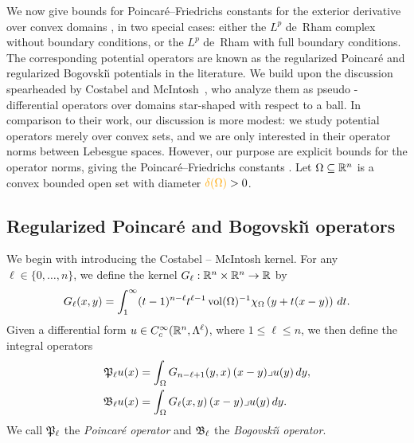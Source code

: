 \documentclass[10pt,letterpaper]{article}
\newcommand\cye[1]{%
  \protect\leavevmode
  \begingroup
    \color{red!35!yellow}%
    #1%
  \endgroup
}
\begin{document}
We \cye{now give} bounds for Poincar\'e--Friedrichs constants for the exterior derivative over convex domains\cye{, in} two special cases: 
either the $L^{p}$ de~Rham complex without boundary conditions, \cye{or} the $L^{p}$ de~Rham with full boundary conditions. 
The corresponding potential operators are known as the regularized Poincar\'e and regularized Bogovski\u{\i} potentials in the literature. 
We build upon the discussion spearheaded by Costabel and McIntosh~\cite{costabel2010bogovskiui},
who analyze them as pseudo\cye{-}differential operators over domains star-shaped with respect to a ball. 
In comparison to their work, our discussion is more modest:
we study potential operators merely over convex sets, and we are only interested in their operator norms between Lebesgue spaces.
However, our purpose are explicit bounds for the operator norms, \cye{giving the Poincar\'e--Friedrichs constants}. Let $\Omega \subseteq {\mathbb R}^{n}$ is a convex bounded open set with diameter $\cye{\diam(\Omega)} > 0$.

\subsection{\cye{Regularized Poincar\'e and Bogovski\u{\i} operators}}

We begin with introducing the Costabel\cye{--}McIntosh kernel.
For any $\ell \in \{0,\dotsc,n\}$, we define the kernel $G_{\ell} : {\mathbb R}^{n} \times {\mathbb R}^{n} \rightarrow {\mathbb R}$ by
\begin{equation}\label{math:mainkernel}
  G_{\ell}(x,y) = \int_{1}^\infty (t-1)^{n-\ell}t^{\ell-1} \operatorname{vol}(\Omega)^{-1}\chi_{\Omega} \left(y+t(x-y)\right)\,dt
  .
\end{equation}
Given a differential form $u \in {C^\infty_c}({\mathbb R}^n,\Lambda^\ell)$, where \(1 \leq \ell \leq n\), 
we then define the integral operators
\begin{align*}
  {\mathfrak P}_{\ell} u(x) &= \int_{\Omega} G_{n-\ell+1}(y,x) \,(x-y)\lrcorner u(y)\,dy,
  \\
  {\mathfrak B}_{\ell} u(x) &= \int_{\Omega} G_{\ell}(x,y) \,(x-y)\lrcorner u(y)\,dy.
\end{align*}
We call ${\mathfrak P}_{\ell}$ the {\em Poincar\'e operator} and ${\mathfrak B}_{\ell}$ the {\em Bogovski\u{\i} operator}. 
\end{document}
